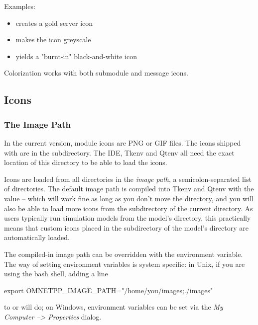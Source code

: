 Examples:

\begin{itemize}
  \item {} creates a gold server icon
  \item {} makes the icon greyscale
  \item {} yields a "burnt-in" black-and-white icon
\end{itemize}

Colorization works with both submodule and message icons.


\subsection{Icons}
\label{sec:ch-graphics:icon-library}

\subsubsection{The Image Path}

In the current {\opp} version, module icons are PNG or GIF files. The icons shipped
with {\opp} are in the  subdirectory. The IDE, Tkenv and Qtenv all
need the exact location of this directory to be able to load the icons.

Icons are loaded from all directories in the \textit{image path},
a semicolon-separated list of directories.
The default image path is compiled into Tkenv and Qtenv with the value
 -- which will work fine
as long as you don't move the directory, and you will also be able to
load more icons from the  subdirectory of the current
directory. As users typically run simulation models from the model's
directory, this practically means that custom icons placed in the
 subdirectory of the model's directory are automatically
loaded.

The compiled-in image path can be overridden with the 
environment variable. The way of setting environment variables is system
specific: in Unix, if you are using the bash shell, adding a line

\begin{commandline}
export OMNETPP_IMAGE_PATH="/home/you/images;./images"
\end{commandline}

to  or  will do;
on Windows, environment variables can be set via the \textit{My Computer --> Properties} dialog.

